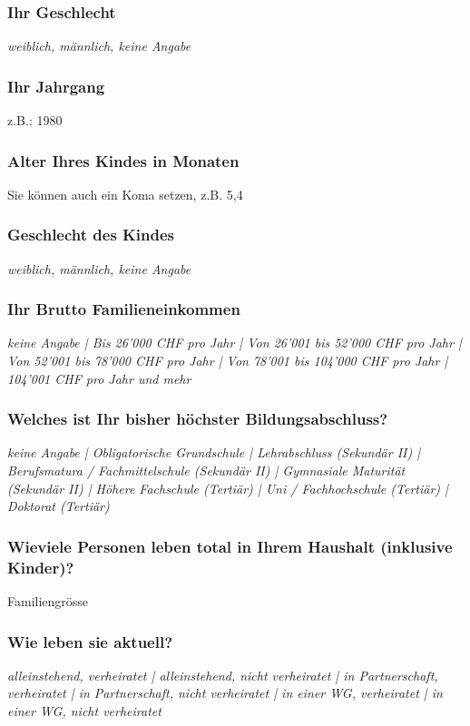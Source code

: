 \subsubsection{Ihr Geschlecht}
\textit{weiblich, männlich, keine Angabe}

\subsubsection{Ihr Jahrgang}
z.B.: 1980

\subsubsection{Alter Ihres Kindes in Monaten}
Sie können auch ein Koma setzen, z.B. 5,4

\subsubsection{Geschlecht des Kindes}
\textit{weiblich, männlich, keine Angabe}

\subsubsection{Ihr Brutto Familieneinkommen}
\textit{keine Angabe | Bis 26’000 CHF pro Jahr | Von 26’001 bis 52’000 CHF pro Jahr | Von 52’001 bis 78’000 CHF pro Jahr | Von 78’001 bis 104’000 CHF pro Jahr | 104’001 CHF pro Jahr und mehr}

\subsubsection{Welches ist Ihr bisher höchster Bildungsabschluss?}
\textit{keine Angabe | Obligatorische Grundschule | Lehrabschluss (Sekundär II) | Berufsmatura / Fachmittelschule (Sekundär II) | Gymnasiale Maturität (Sekundär II) | Höhere Fachschule (Tertiär) | Uni / Fachhochschule (Tertiär) | Doktorat (Tertiär)}

\subsubsection{Wieviele Personen leben total in Ihrem Haushalt (inklusive Kinder)?}
Familiengrösse

\subsubsection{Wie leben sie aktuell?}
\textit{alleinstehend, verheiratet | alleinstehend, nicht verheiratet | in Partnerschaft, verheiratet | in Partnerschaft, nicht verheiratet | in einer WG, verheiratet | in einer WG, nicht verheiratet}


